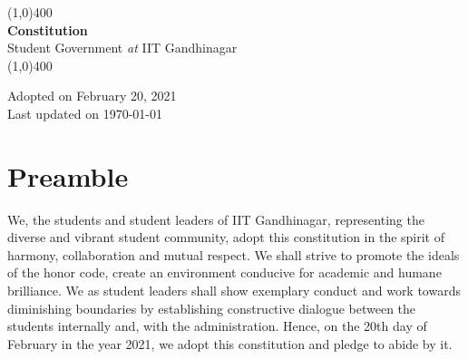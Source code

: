 \documentclass[12pt]{article}
\begin{document}
\begin{titlepage}

\quad

\quad

\begin{center}    
        


\quad

    \vspace{2 in}
    
    \line(1,0){400} \\
    [0.1in]
    \huge{\bfseries Constitution}\\
    \huge{Student Government \textit{at} IIT Gandhinagar}\\
    [0.1in]
    \line(1,0){400} \\
\end{center}

\quad

\vspace{3 in}

\noindent \large{Adopted on February 20, 2021} \\
\noindent \large{Last updated on \today}


\end{titlepage}

\newpage
\tableofcontents

\newpage
\section{Preamble}
We, the students and student leaders of IIT Gandhinagar, representing the diverse and vibrant student community, adopt this constitution in the spirit of harmony, collaboration and mutual respect. We shall strive to promote the ideals of the honor code, create an environment conducive for academic and humane brilliance. We as student leaders shall show exemplary conduct and work towards diminishing boundaries by establishing constructive dialogue between the students internally and, with the administration. Hence, on the 20th day of February in the year 2021, we adopt this constitution and pledge to abide by it.
\end{document}
